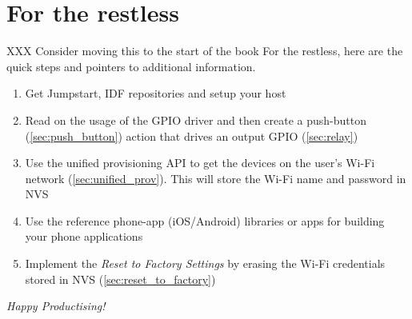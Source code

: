 \documentclass[11pt,fleqn]{book} %
\begin{document}

\pagestyle{empty} %

\tableofcontents %


\pagestyle{fancy} %


















\chapter{For the restless}
XXX Consider moving this to the start of the book
For the restless, here are the quick steps and pointers to additional information.
\begin{enumerate}
    \item Get Jumpstart, IDF repositories and setup your host
    \item Read on the usage of the GPIO driver and then create a push-button (\ref{sec:push_button}) action that drives an output GPIO (\ref{sec:relay})
    \item Use the unified provisioning API to get the devices on the user's Wi-Fi network (\ref{sec:unified_prov}). This will store the Wi-Fi name and password in NVS
    \item Use the reference phone-app (iOS/Android) libraries or apps for building your phone applications
    \item Implement the \textit{Reset to Factory Settings} by erasing the Wi-Fi credentials stored in NVS (\ref{sec:reset_to_factory})
\end{enumerate}

\clearpage
\vspace*{\fill} 
\centering \Huge {\textit{Happy Productising!}}
\vspace*{\fill} 
\end{document}

